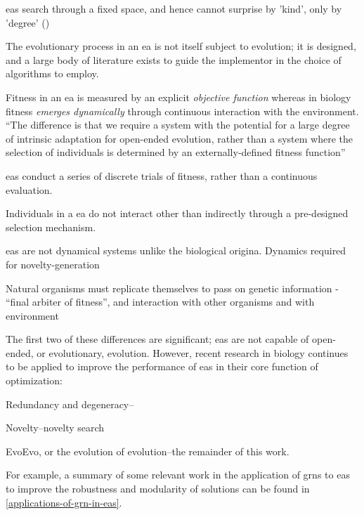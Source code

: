 \begin{compactitem}
\item \Glspl{ea} search through a fixed space, and hence cannot surprise by 'kind', only by 'degree' (\eg \parencite{Nellis2014})
\item The evolutionary process in an \gls{ea} is not itself subject to evolution; it is designed, and a large body of literature exists to guide the implementor in the choice of algorithms to employ.
\item Fitness in an \gls{ea} is measured by an explicit \emph{objective function} whereas in biology fitness \emph{emerges dynamically} through continuous interaction with the environment. ``The difference is that we require a system with the potential for a large degree of intrinsic adaptation for open-ended evolution, rather than a system where the selection of individuals is determined by an externally-defined fitness function'' \parencite{Taylor2001}
\item \Glspl{ea} conduct a series of discrete trials of fitness, rather than a continuous evaluation.
\item Individuals in a \gls{ea} do not interact other than indirectly through a pre-designed selection mechanism.
\item \Glspl{ea} are not dynamical systems unlike the biological origina. Dynamics required for novelty-generation \parencite{Nellis2012}
\item Natural organisms must replicate themselves to pass on genetic information - ``final arbiter of fitness'', and interaction with other organisms and with environment \parencite{Ofria2004}
\end{compactitem}

The first two of these differences are significant; \glspl{ea} are not capable of open-ended, or evolutionary, evolution. However, recent research in biology continues to be applied to improve the performance of \glspl{ea} in their core function of optimization:
\begin{compactitem}
	\item Redundancy and degeneracy--\eg \parencite{Whitacre:2010qy}
	\item Novelty--\eg novelty search \parencite{Lehman:2008cr}
	\item EvoEvo, or the evolution of evolution--\eg the remainder of this work.
\end{compactitem}

For example, a summary of some relevant work in the application of \glspl{grn} to \glspl{ea} to improve the robustness and modularity of solutions can be found in \ref{applications-of-grn-in-eas}.

